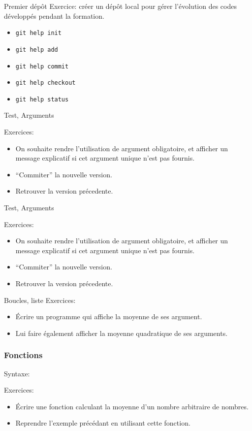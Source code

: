 \documentclass{beamer}
\begin{document}
\begin{frame}{Premier dépôt}
  Exercice: créer un dépôt local pour gérer l'évolution des codes développés pendant la formation.
  \begin{itemize}
  \item {\tt git help init}
  \item {\tt git help add}
  \item {\tt git help commit}
  \item {\tt git help checkout}
  \item {\tt git help status}
  \end{itemize}
\end{frame}

\begin{frame}{Test, Arguments}
  
  Exercices:
  \begin{itemize}
  \item On souhaite rendre l'utilisation de argument obligatoire, et afficher un message explicatif si cet argument unique n'est pas fournis.
  \item ``Commiter''  la nouvelle version.
  \item Retrouver la version précedente.
  \end{itemize}
\end{frame}

\begin{frame}{Test, Arguments}
  
  Exercices:
  \begin{itemize}
  \item On souhaite rendre l'utilisation de argument obligatoire, et afficher un message explicatif si cet argument unique n'est pas fournis.
  \item ``Commiter''  la nouvelle version.
  \item Retrouver la version précedente.
  \end{itemize}
\end{frame}

\begin{frame}{Boucles, liste}
  Exercices:
  \begin{itemize}
  \item Écrire un programme qui affiche la moyenne de ses argument.
  \item Lui faire également afficher la moyenne quadratique de ses arguments.
  \end{itemize}
\end{frame}

\begin{frame}[fragile]\frametitle{Fonctions}
  Syntaxe:
  \fbox{}

  Exercices:
  \begin{itemize}
  \item Écrire une fonction calculant la moyenne d'un nombre arbitraire de nombres.
  \item Reprendre l'exemple précédant en utilisant cette fonction.
  \end{itemize}
\end{frame}
\end{document}
